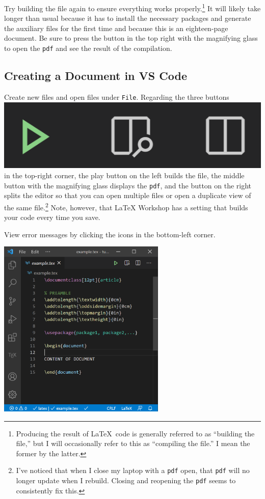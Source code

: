 \documentclass{article} 		%
\begin{document}
Try building the file again to ensure everything works properly.\footnote{
	Producing the result of \LaTeX\ code is generally referred to as ``building the file,'' but I will occasionally refer to this as ``compiling the file.'' I mean the former by the latter. 
} 
It will likely take longer than usual because it has to install the necessary packages and generate the auxiliary files for the first time and because this is an eighteen-page document. Be sure to press the button in the top right with the magnifying glass to open the \texttt{pdf} and see the result of the compilation. 

\subsection{Creating a Document in VS Code} \label{subsec:creating-document}
Create new files and open files under \texttt{File}. Regarding the three buttons \includegraphics[scale=0.08]{compiling.png} in the top-right corner, the play button on the left builds the file, the middle button with the magnifying glass displays the \texttt{pdf}, and the button on the right splits the editor so that you can open multiple files or open a duplicate view of the same file.\footnote{
	I've noticed that when I close my laptop with a \texttt{pdf} open, that \texttt{pdf} will no longer update when I rebuild. Closing and reopening the \texttt{pdf} seems to consistently fix this. 
} 
Note, however, that LaTeX Workshop has a setting that builds your code every time you save. \par
View error messages by clicking the icons in the bottom-left corner. 
\begin{center}
	\includegraphics[width=0.6\textwidth]{creatingDocument.png}
\end{center}
\end{document}
